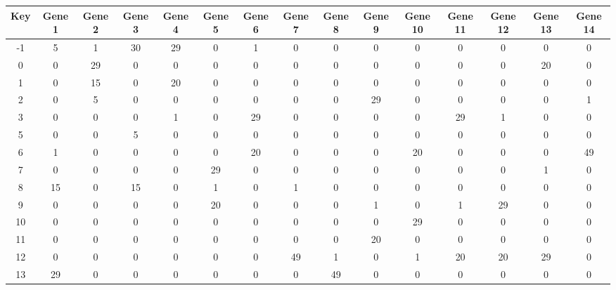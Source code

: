 \begin{tabular}{|c|c|c|c|c|c|c|c|c|c|c|c|c|c|c|}
\hline
Key & Gene 1 & Gene 2 & Gene 3 & Gene 4 & Gene 5 & Gene 6 & Gene 7 & Gene 8 & Gene 9 & Gene 10 & Gene 11 & Gene 12 & Gene 13 & Gene 14 \\
\hline
-1 & 5 & 1 & 30 & 29 & 0 & 1 & 0 & 0 & 0 & 0 & 0 & 0 & 0 & 0 \\
0 & 0 & 29 & 0 & 0 & 0 & 0 & 0 & 0 & 0 & 0 & 0 & 0 & 20 & 0 \\
1 & 0 & 15 & 0 & 20 & 0 & 0 & 0 & 0 & 0 & 0 & 0 & 0 & 0 & 0 \\
2 & 0 & 5 & 0 & 0 & 0 & 0 & 0 & 0 & 29 & 0 & 0 & 0 & 0 & 1 \\
3 & 0 & 0 & 0 & 1 & 0 & 29 & 0 & 0 & 0 & 0 & 29 & 1 & 0 & 0 \\
5 & 0 & 0 & 5 & 0 & 0 & 0 & 0 & 0 & 0 & 0 & 0 & 0 & 0 & 0 \\
6 & 1 & 0 & 0 & 0 & 0 & 20 & 0 & 0 & 0 & 20 & 0 & 0 & 0 & 49 \\
7 & 0 & 0 & 0 & 0 & 29 & 0 & 0 & 0 & 0 & 0 & 0 & 0 & 1 & 0 \\
8 & 15 & 0 & 15 & 0 & 1 & 0 & 1 & 0 & 0 & 0 & 0 & 0 & 0 & 0 \\
9 & 0 & 0 & 0 & 0 & 20 & 0 & 0 & 0 & 1 & 0 & 1 & 29 & 0 & 0 \\
10 & 0 & 0 & 0 & 0 & 0 & 0 & 0 & 0 & 0 & 29 & 0 & 0 & 0 & 0 \\
11 & 0 & 0 & 0 & 0 & 0 & 0 & 0 & 0 & 20 & 0 & 0 & 0 & 0 & 0 \\
12 & 0 & 0 & 0 & 0 & 0 & 0 & 49 & 1 & 0 & 1 & 20 & 20 & 29 & 0 \\
13 & 29 & 0 & 0 & 0 & 0 & 0 & 0 & 49 & 0 & 0 & 0 & 0 & 0 & 0 \\
\hline
\end{tabular}